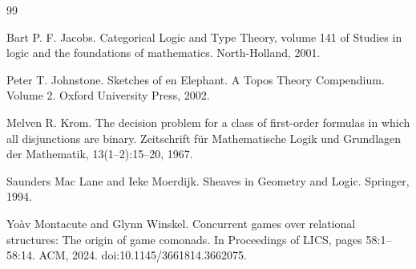 \documentclass[10pt,a4paper]{amsart}
\begin{document}
\begin{thebibliography}{99}
\par\noindent  [18]  Bart P. F. Jacobs.  Categorical Logic and Type Theory, volume 141 of Studies in logic and the foundations of mathematics.  North-Holland, 2001.  
 
\par\noindent  [19]  Peter T. Johnstone.  Sketches of en Elephant. A Topos Theory Compendium. Volume 2.  Oxford University Press, 2002.  
 
\par\noindent  [20]  Melven R. Krom.  The decision problem for a class of first-order formulas in which all disjunctions are binary.  Zeitschrift für Mathematische Logik und Grundlagen der Mathematik, 13(1–2):15–20, 1967.  
 
\par\noindent  [21]  Saunders Mac Lane and Ieke Moerdijk.  Sheaves in Geometry and Logic.  Springer, 1994.  
 
\par\noindent  [22]  Yoàv Montacute and Glynn Winskel.  Concurrent games over relational structures: The origin of game comonads.  In Proceedings of LICS, pages 58:1–58:14. ACM, 2024.  doi:10.1145/3661814.3662075.  
  
\end{thebibliography}
\end{document}
